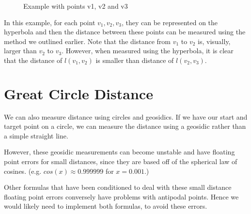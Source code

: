 \documentclass[12pt,a4paper]{report}
\begin{document}
\begin{figure}
\caption{Example with points v1, v2 and v3}
\end{figure}

In this example, for each point $v_{1}, v_{2}, v_{3}$, they can be represented on the hyperbola and then the distance between these points can be measured using the method we outlined earlier. Note that the distance from $v_{1}$ to $v_{2}$ is, visually, larger than $v_{2}$ to $v_{3}$. However, when measured using the hyperbola, it is clear that the distance of $l(v_{1}, v_{2})$ is smaller than distance of $l(v_{2}, v_{3})$.


\section{Great Circle Distance}
We can also measure distance using circles and geosidics. If we have our start and target point on a circle, we can measure the distance using a geosidic rather than a simple straight line.

However, these geosidic measurements can become unstable and have floating point errors for small distances, since they are based off of the spherical law of cosines. (e.g. $cos(x) \approx 0.999999$ for $x = 0.001$.)



Other formulas that have been conditioned to deal with these small distance floating point errors conversely have problems with antipodal points. Hence we would likely need to implement both formulas, to avoid these errors.
\end{document}
